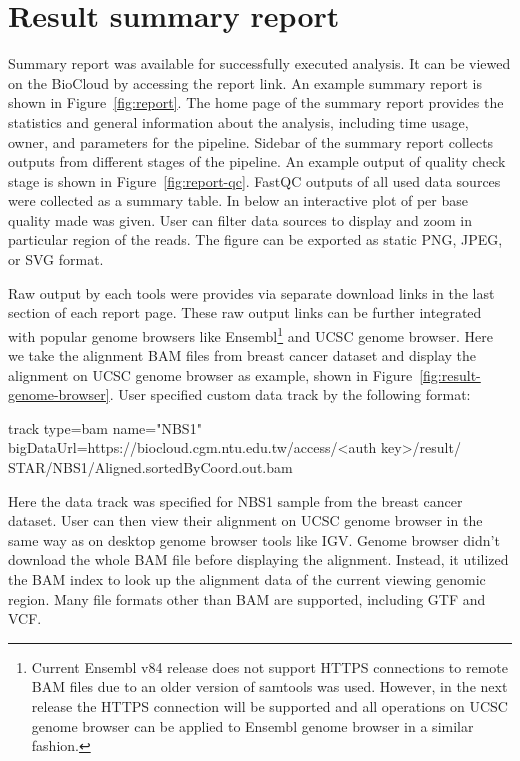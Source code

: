 \section{Result summary report}

Summary report was available for successfully executed analysis. It can be
viewed on the BioCloud by accessing the report link. An example summary report
is shown in Figure~\ref{fig:report}. The home page of the summary report
provides the statistics and general information about the analysis, including
time usage, owner, and parameters for the pipeline. Sidebar of the summary
report collects outputs from different stages of the pipeline. An example output
of quality check stage is shown in Figure~\ref{fig:report-qc}. FastQC outputs
of all used data sources were collected as a summary table. In below an
interactive plot of per base quality made was given. User can filter data
sources to display and zoom in particular region of the reads. The figure can
be exported as static PNG, JPEG, or SVG format.




Raw output by each tools were provides via separate download links in the last
section of each report page. These raw output links can be further integrated
with popular genome browsers like Ensembl\footnote{
    Current Ensembl v84 release does not support HTTPS connections to remote
    BAM files due to an older version of samtools was used. However, in the
    next release the HTTPS connection will be supported and all operations on
    UCSC genome browser can be applied to Ensembl genome browser in a similar
    fashion.
} and UCSC genome browser. Here we take the alignment BAM files from breast cancer
dataset and display the alignment on UCSC genome browser as example, shown in
Figure~\ref{fig:result-genome-browser}. User specified custom data track by the
following format:

\begin{CVerbatim}[fontsize=\small]
track type=bam name="NBS1"
bigDataUrl=https://biocloud.cgm.ntu.edu.tw/access/<auth key>/result/
STAR/NBS1/Aligned.sortedByCoord.out.bam
\end{CVerbatim}

\vspace{-1em}\noindent
Here the data track was specified for NBS1 sample from the breast cancer
dataset. User can then view their alignment on UCSC genome browser in the same
way as on desktop genome browser tools like IGV. Genome browser didn't download
the whole BAM file before displaying the alignment. Instead, it utilized the
BAM index to look up the alignment data of the current viewing genomic region.
Many file formats other than BAM are supported, including GTF and VCF.





